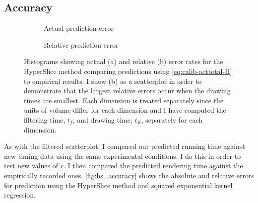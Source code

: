 \begin{table}[h]
\centering
\caption[Rendering time calibration results]{%
  Table showing the calibrated parameters, $a$, $t_f$, and $t_\text{H}$,
  as a result of running a segmented regression fit using the data I gathered
  from my timing experiments and \autoref{eq:expanded-regression}.
  The factors $t_f$ and $t_\text{H}$ are in nanoseconds and $a$ is defined
  in terms of fragments per sample.
}

\label{tbl:model_fits}
\end{table}

\subsection{Accuracy}
 
\begin{figure}[t]
  \centering
  \begin{subfigure}{0.5\linewidth}
    
    \caption{Actual prediction error}
    \label{fig:hs_abs_error}
  \end{subfigure}%
  \begin{subfigure}{0.5\linewidth}
    
    \caption{Relative prediction error}
    \label{fig:hs_rel_error}
  \end{subfigure}
  \caption[Actual and relative error rates of prediction]{%
    Histograms showing actual (a) and relative (b) error rates
    for the HyperSlice method
    comparing predictions using \autoref{eq:calib-acttotal-H} to empirical 
    results.  I show (b) as a scatterplot in order to demonstrate that
    the largest relative errors occur when the drawing times are 
    smallest.
    Each dimension is treated separately since the units of volume differ
    for each dimension and I have computed the filtering time, $t_f$,
    and drawing time, $t_\text{H}$, separately for each dimension.
  }
  \label{fig:hs_accuracy}
\end{figure}

As with the filtered scatterplot, I compared our predicted running time
against new timing data using the same experimental conditions.  I do this
in order to test new values of $r$.  I then compared the predicted 
rendering time against the empirically recorded ones. 
\autoref{fig:hs_accuracy} shows the absolute and relative
errors for prediction using the HyperSlice method and squared exponential 
kernel regression.

